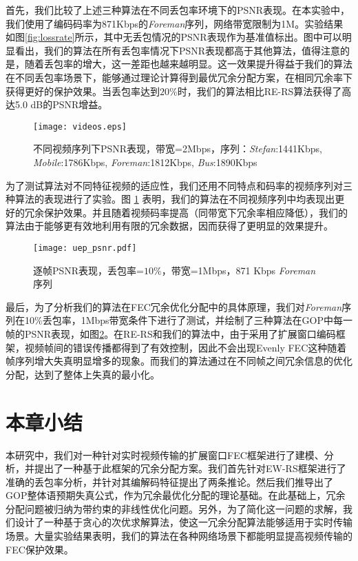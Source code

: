 首先，我们比较了上述三种算法在不同丢包率环境下的PSNR表现。在本实验中，我们使用了编码码率为871Kbps的\emph{Foreman}序列，网络带宽限制为1M。实验结果如图\ref{fig:lossrate}所示，其中无丢包情况的PSNR表现作为基准值标出。图中可以明显看出，我们的算法在所有丢包率情况下PSNR表现都高于其他算法，值得注意的是，随着丢包率的增大，这一差距也越来越明显。这一效果提升得益于我们的算法在不同丢包率场景下，能够通过理论计算得到最优冗余分配方案，在相同冗余率下获得更好的保护效果。当丢包率达到$20\%$时，我们的算法相比RE-RS算法获得了高达5.0 dB的PSNR增益。

\begin{figure}[htbp]
  \centering
  \texttt{[image: videos.eps]}\\
  \caption{不同视频序列下PSNR表现，带宽=2Mbps，序列：\emph{Stefan}:1441Kbps, \emph{Mobile}:1786Kbps, \emph{Foreman}:1812Kbps, \emph{Bus}:1890Kbps}\label{fig:videos}
\end{figure}

为了测试算法对不同特征视频的适应性，我们还用不同特点和码率的视频序列对三种算法的表现进行了实验。图 \ref{fig:videos} 表明，我们的算法在不同视频序列中均表现出更好的冗余保护效果。并且随着视频码率提高（同带宽下冗余率相应降低），我们的算法由于能够更有效地利用有限的冗余数据，因而获得了更明显的效果提升。

\begin{figure}[htbp]
  \centering
  \texttt{[image: uep\_psnr.pdf]}
  \caption{逐帧PSNR表现，丢包率=$10\%$，带宽=1Mbps，871 Kbps \emph{Foreman}序列}\label{fig:psnr}
\end{figure}

最后，为了分析我们的算法在FEC冗余优化分配中的具体原理，我们对\emph{Foreman}序列在10\%丢包率，1Mbps带宽条件下进行了测试，并绘制了三种算法在GOP中每一帧的PSNR表现，如图\ref{fig:psnr}。在RE-RS和我们的算法中，由于采用了扩展窗口编码框架，视频帧间的错误传播都得到了有效控制，因此不会出现Evenly FEC这种随着帧序列增大失真明显增多的现象。而我们的算法通过在不同帧之间冗余信息的优化分配，达到了整体上失真的最小化。


\section{本章小结}
本研究中，我们对一种针对实时视频传输的扩展窗口FEC框架进行了建模、分析，并提出了一种基于此框架的冗余分配方案。我们首先针对EW-RS框架进行了准确的丢包率分析，并针对其编解码特征提出了两条推论。然后我们推导出了GOP整体语预期失真公式，作为冗余最优化分配的理论基础。在此基础上，冗余分配问题被归纳为带约束的非线性优化问题。另外，为了简化这一问题的求解，我们设计了一种基于贪心的次优求解算法，使这一冗余分配算法能够适用于实时传输场景。大量实验结果表明，我们的算法在各种网络场景下都能明显提高视频传输的FEC保护效果。
